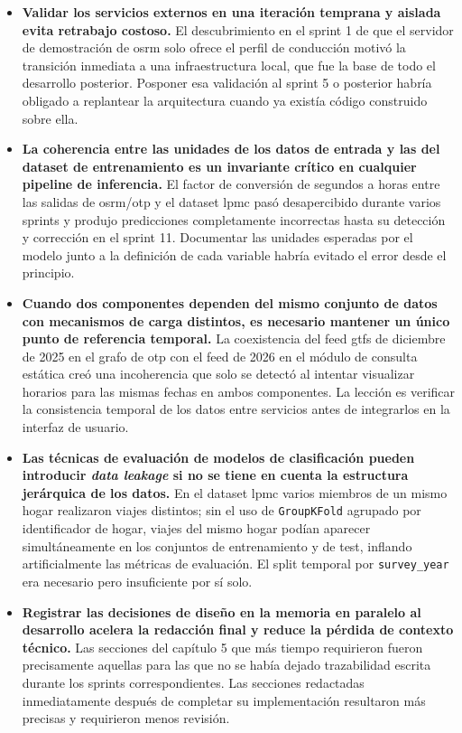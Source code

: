 \begin{itemize}
  \item \textbf{Validar los servicios externos en una iteración temprana y aislada evita retrabajo costoso.} El descubrimiento en el sprint 1 de que el servidor de demostración de \gls{osrm} solo ofrece el perfil de conducción motivó la transición inmediata a una infraestructura local, que fue la base de todo el desarrollo posterior. Posponer esa validación al sprint 5 o posterior habría obligado a replantear la arquitectura cuando ya existía código construido sobre ella.
\newpage
  \item \textbf{La coherencia entre las unidades de los datos de entrada y las del dataset de entrenamiento es un invariante crítico en cualquier pipeline de inferencia.} El factor de conversión de segundos a horas entre las salidas de \gls{osrm}/\gls{otp} y el dataset \gls{lpmc} pasó desapercibido durante varios sprints y produjo predicciones completamente incorrectas hasta su detección y corrección en el sprint 11. Documentar las unidades esperadas por el modelo junto a la definición de cada variable habría evitado el error desde el principio.\newline

  \item \textbf{Cuando dos componentes dependen del mismo conjunto de datos con mecanismos de carga distintos, es necesario mantener un único punto de referencia temporal.} La coexistencia del feed \gls{gtfs} de diciembre de 2025 en el grafo de \gls{otp} con el feed de 2026 en el módulo de consulta estática creó una incoherencia que solo se detectó al intentar visualizar horarios para las mismas fechas en ambos componentes. La lección es verificar la consistencia temporal de los datos entre servicios antes de integrarlos en la interfaz de usuario.\newline

  \item \textbf{Las técnicas de evaluación de modelos de clasificación pueden introducir \textit{data leakage} si no se tiene en cuenta la estructura jerárquica de los datos.} En el dataset \gls{lpmc} varios miembros de un mismo hogar realizaron viajes distintos; sin el uso de \texttt{GroupKFold} agrupado por identificador de hogar, viajes del mismo hogar podían aparecer simultáneamente en los conjuntos de entrenamiento y de test, inflando artificialmente las métricas de evaluación. El split temporal por \texttt{survey\_year} era necesario pero insuficiente por sí solo.\newline

  \item \textbf{Registrar las decisiones de diseño en la memoria en paralelo al desarrollo acelera la redacción final y reduce la pérdida de contexto técnico.} Las secciones del capítulo 5 que más tiempo requirieron fueron precisamente aquellas para las que no se había dejado trazabilidad escrita durante los sprints correspondientes. Las secciones redactadas inmediatamente después de completar su implementación resultaron más precisas y requirieron menos revisión.
\end{itemize}
\newpage
